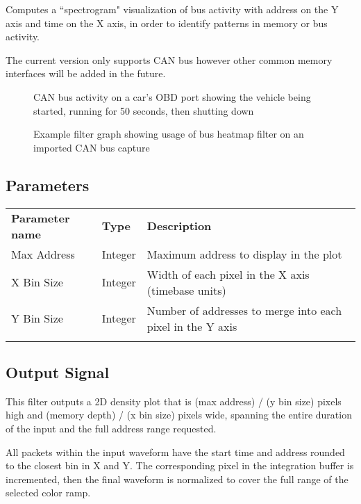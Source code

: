 Computes a ``spectrogram" visualization of bus activity with address on the Y axis and time on the X axis, in order to
identify patterns in memory or bus activity.

The current version only supports CAN bus however other common memory interfaces will be added in the future.

\begin{figure}[h]
\centering
{}
\caption{CAN bus activity on a car's OBD port showing the vehicle being started, running for 50 seconds, then shutting down}
\label{filter_busheatmap}
\end{figure}

\begin{figure}[h]
\centering
{}
\caption{Example filter graph showing usage of bus heatmap filter on an imported CAN bus capture}
\label{filter_graph_busheatmap}
\end{figure}
\FloatBarrier

\subsection{Parameters}

\begin{tabularx}{16cm}{llX}
\thickhline
\textbf{Parameter name} & \textbf{Type} & \textbf{Description} \\
\thickhline
Max Address & Integer & Maximum address to display in the plot \\
\thinhline
X Bin Size & Integer & Width of each pixel in the X axis (timebase units) \\
\thinhline
Y Bin Size & Integer & Number of addresses to merge into each pixel in the Y axis \\
\thickhline
\end{tabularx}

\subsection{Output Signal}

This filter outputs a 2D density plot that is (max address) / (y bin size) pixels high and (memory depth) / (x bin
size) pixels wide, spanning the entire duration of the input and the full address range requested.

All packets within the input waveform have the start time and address rounded to the closest bin in X and Y. The
corresponding pixel in the integration buffer is incremented, then the final waveform is normalized to cover the full
range of the selected color ramp.

